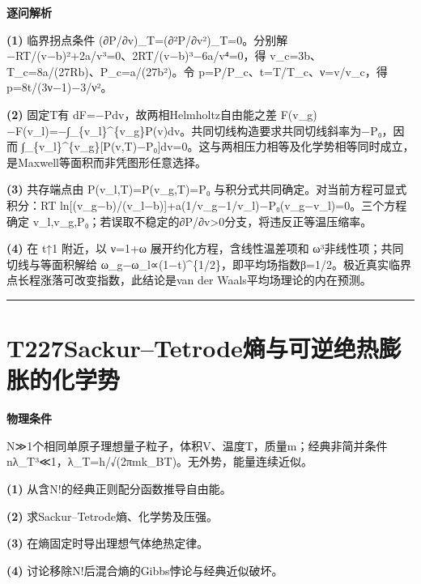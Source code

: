 \documentclass[UTF8,a4paper,11pt,oneside,openany]{ctexbook}
\begin{document}
\par\medskip\noindent\textbf{逐问解析}
\par\noindent\textbf{(1)} 临界拐点条件 (∂P/∂v)\_T=(∂²P/∂v²)\_T=0。分别解 −RT/(v−b)²+2a/v³=0、2RT/(v−b)³−6a/v⁴=0，得 v\_c=3b、T\_c=8a/(27Rb)、P\_c=a/(27b²)。令 p=P/P\_c、t=T/T\_c、ν=v/v\_c，得 p=8t/(3ν−1)−3/ν²。
\par\noindent\textbf{(2)} 固定T有 dF=−Pdv，故两相Helmholtz自由能之差 F(v\_g)−F(v\_l)=−∫\_\{v\_l\}\textasciicircum{}\{v\_g\}P(v)dv。共同切线构造要求共同切线斜率为−P₀，因而 ∫\_\{v\_l\}\textasciicircum{}\{v\_g\}[P(v,T)−P₀]dv=0。这与两相压力相等及化学势相等同时成立，是Maxwell等面积而非凭图形任意选择。
\par\noindent\textbf{(3)} 共存端点由 P(v\_l,T)=P(v\_g,T)=P₀ 与积分式共同确定。对当前方程可显式积分：RT ln[(v\_g−b)/(v\_l−b)]+a(1/v\_g−1/v\_l)−P₀(v\_g−v\_l)=0。三个方程确定 v\_l,v\_g,P₀；若误取不稳定的∂P/∂v>0分支，将违反正等温压缩率。
\par\noindent\textbf{(4)} 在 t↑1 附近，以 ν=1+ω 展开约化方程，含线性温差项和 ω³非线性项；共同切线与等面积解给 ω\_g−ω\_l∝(1−t)\textasciicircum{}\{1/2\}，即平均场指数β=1/2。极近真实临界点长程涨落可改变指数，此结论是van der Waals平均场理论的内在预测。

\par\bigskip\hrule\bigskip
\section*{T227\quad Sackur–Tetrode熵与可逆绝热膨胀的化学势}
\textbf{物理条件}\par N≫1个相同单原子理想量子粒子，体积V、温度T，质量m；经典非简并条件 nλ\_T³≪1，λ\_T=h/√(2πmk\_BT)。无外势，能量连续近似。
\par\noindent\textbf{(1)} 从含N!的经典正则配分函数推导自由能。
\par\noindent\textbf{(2)} 求Sackur–Tetrode熵、化学势及压强。
\par\noindent\textbf{(3)} 在熵固定时导出理想气体绝热定律。
\par\noindent\textbf{(4)} 讨论移除N!后混合熵的Gibbs悖论与经典近似破坏。
\end{document}

